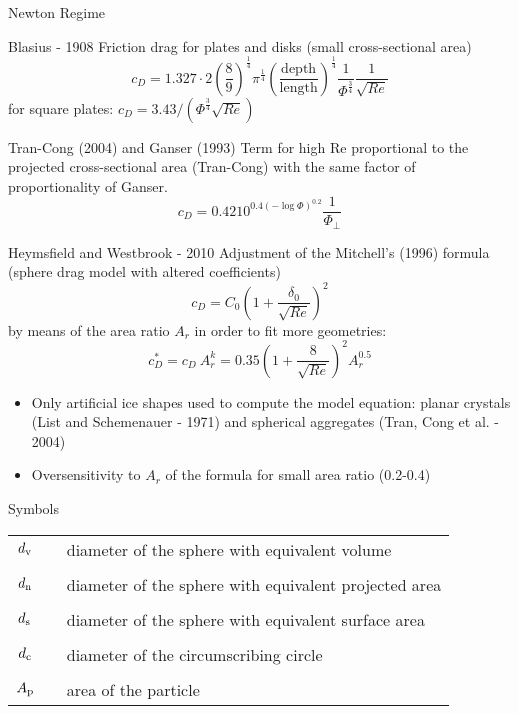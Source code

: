 \documentclass[11pt]{beamer}
\begin{document}
	\begin{frame}{Newton Regime}
		\begin{block}{Blasius - 1908}
			Friction drag for plates and disks (small cross-sectional area)
			\begin{equation*}
				c_D = 1.327 \cdot 2 \left(\frac{8}{9}\right)^{\frac{1}{4}} \pi^{\frac{1}{4}} \left(\frac{\text{depth}}{\text{length}}\right)^{\frac{1}{4}} \frac{1}{\Phi^{\frac{3}{4}}} \frac{1}{\sqrt{Re}}
			\end{equation*}
			for square plates: \quad $ c_D = 3.43 / (\Phi^{\frac{3}{4}} \sqrt{Re}) $
		\end{block}
	
		\begin{block}{Tran-Cong (2004) and Ganser (1993)}
			Term for high Re proportional to the projected cross-sectional area (Tran-Cong) with the same factor of proportionality of Ganser.
			\begin{equation*}
				c_D = 0.4210^{0.4(-\log \Phi)^{0.2}} \frac{1}{\Phi_{\perp}}
			\end{equation*}
		\end{block}
	\end{frame}

	\begin{frame}{Heymsfield and Westbrook - 2010}
		Adjustment of the Mitchell's (1996) formula (sphere drag model with altered coefficients)
		\begin{equation*}
			c_D = C_0 \left( 1 + \frac{\delta_0}{\sqrt{Re}} \right)^2
		\end{equation*}
		by means of the area ratio $ A_r $ in order to fit more geometries:
		\begin{equation*}
			c_D^* = c_D \ A_r^k = 0.35 \left( 1 + \frac{8}{\sqrt{Re}} \right)^2 A_r^{0.5}
		\end{equation*}
		\begin{itemize}
			\item Only artificial ice shapes used to compute the model equation: planar crystals (List and Schemenauer - 1971) and spherical aggregates (Tran, Cong et al. - 2004)
			\item Oversensitivity to $ A_r $ of the formula for small area ratio (0.2-0.4)
		\end{itemize}
	\end{frame}
	
	\begin{frame}{Symbols}
		\begin{tabular}{ccl}
			$ d_{\textup{v}} $ & & diameter of the sphere with equivalent volume \\
			\\
			$ d_{\textup{n}} $ & & diameter of the sphere with equivalent projected area\\
			\\
			$ d_{\textup{s}} $ & & diameter of the sphere with equivalent surface area\\
			\\
			$ d_{\textup{c}} $ & & diameter of the circumscribing circle\\
			\\
			$ A_{\textup{p}} $ & & area of the particle
		\end{tabular}
	\end{frame}
\end{document}
